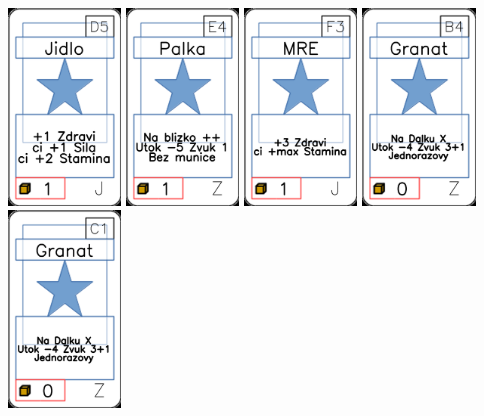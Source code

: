 \documentclass[a4paper]{article}
\begin{document}
	\includegraphics[width=3.0cm]{img-1_19}
	\includegraphics[width=3.0cm]{img-1_83}
	\includegraphics[width=3.0cm]{img-1_27}
	\includegraphics[width=3.0cm]{img-1_98}
	\includegraphics[width=3.0cm]{img-1_100}
\end{document}
